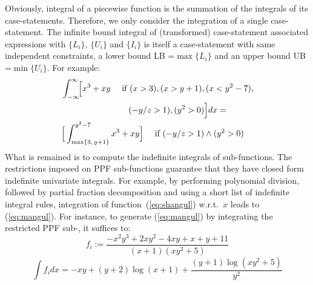 \documentclass[letterpaper]{article}
\newcommand{\singlecase}[2]{#2 \quad \text{ if } #1}
\begin{document}
Obviously, integral of a piecewise function is the summation of the integrals of its case-statements.
Therefore, we only consider the integration of a single case-statement.
The infinite bound integral of (transformed) case-statement 
associated expressions with $\{L_i\}$, $\{U_i\}$ and $\{I_i\}$ 
is itself a case-statement with same independent constraints,
a lower bound LB =$\max\{L_i\}$ and 
an upper bound UB =$ \min\{U_i\}$.
For example: 
\begin{align*}
&\int_{-\infty}^{\infty}\!\! \Big[
\singlecase{(x>3), (x>y+1), (x<y^2-7), \\
&\hspace{28mm} (-y/z > 1) , (y^2>0)}
{x^3 + xy} \Big] dx = \\
&\singlecase{(-y/z > 1) \wedge (y^2>0)}
{\Big[ \int_{\max\{3, \, y+1\}}^{y^2 - 7}x^3 + xy \Big]} 
\end{align*}  
What is remained is to compute the indefinite integrals of sub-functions. 
The restrictions imposed on PPF sub-functions 
guarantee that they have closed form indefinite univariate integrals.
For example, 
by performing polynomial division,
followed by partial fraction decomposition 
and using a short list of indefinite integral rules, 
integration of function~(\ref{eq:shangul}) w.r.t.\ $x$ leads to (\ref{eq:mangul}).
For instance, to generate (\ref{eq:mangul}) by integrating the restricted PPF sub-, it suffices to:
\begin{equation}
\label{eq:shangul}
f_i := \frac{-x^2 y^3 + 2x y^2 -4 x y + x + y + 11}{(x+1)(x y^2 + 5)}
\end{equation}
\begin{equation}
\label{eq:mangul}
\int f_i dx = 
-x y  + (y+2) \log (x+1) + \frac{(y+1) \log (x y^2 + 5)}{y^2}
\end{equation}
\end{document}
